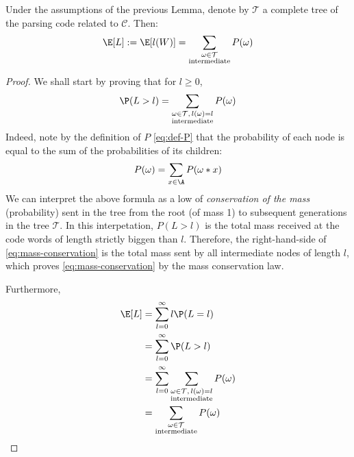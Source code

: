 \documentclass[toc]{../cs-classes/cs-classes}
\begin{document}
\begin{lemma}
    Under the assumptions of the previous Lemma, denote by $\mathcal{T}$ a complete tree of the parsing code related to $\mathcal{C}$. Then:
    \begin{equation}
        \E[L] := \E[l(W)] = \sum_{\substack{\omega\in\mathcal{T}\\\textnormal{intermediate}}}P(\omega)
    \end{equation}
\end{lemma}
\begin{proof}
    We shall start by proving that for $l\geq0$,
    \begin{equation*}
        \label{eq:mass-conservation}
        \P(L>l) = \sum_{\substack{\omega\in\mathcal{T}, \,l(\omega)=l\\\textnormal{intermediate}}}P(\omega)
    \end{equation*}
    Indeed, note by the definition of $P$ \eqref{eq:def-P} that the probability of each node is equal to the sum of the probabilities of its children:
    \begin{equation*}
        P(\omega) = \sum_{x\in\A}P(\omega*x)
    \end{equation*}
    We can interpret the above formula as a low of \emph{conservation of the mass} (probability) sent in the tree from the root (of mass 1) to subsequent generations in the tree $\mathcal{T}$. In this interpetation, $P(L>l)$ is the total mass received at the code words of length strictly biggen than $l$. Therefore, the right-hand-side of \eqref{eq:mass-conservation} is the total mass sent by all intermediate nodes of length $l$, which proves \eqref{eq:mass-conservation} by the mass conservation law.

    Furthermore,
    \begin{equation*}
        \begin{aligned}
            \E[L] &= \sum_{l=0}^\infty l\P(L=l)\\
            &= \sum_{l=0}^\infty \P(L>l)\\
            &= \sum_{l=0}^\infty \sum_{\substack{\omega\in\mathcal{T}, \,l(\omega)=l\\\textnormal{intermediate}}}P(\omega)\\
            &= \sum_{\substack{\omega\in\mathcal{T}\\\textnormal{intermediate}}}P(\omega)
        \end{aligned}
    \end{equation*}
\end{proof}
\end{document}
